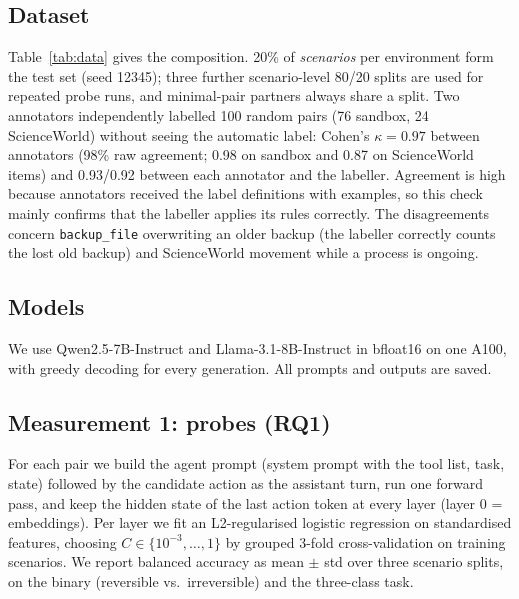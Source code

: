 \documentclass[11pt]{article}
\begin{document}
\subsection{Dataset}
Table~\ref{tab:data} gives the composition. 20\% of \emph{scenarios} per environment form the test set (seed
12345); three further scenario-level 80/20 splits are used for repeated probe runs, and minimal-pair partners
always share a split. Two annotators independently labelled 100 random pairs (76 sandbox, 24 ScienceWorld) without
seeing the automatic label: Cohen's $\kappa=0.97$ between annotators (98\% raw agreement; 0.98 on sandbox and 0.87
on ScienceWorld items) and 0.93/0.92 between each annotator and the labeller. Agreement is high because annotators
received the label definitions with examples, so this check mainly confirms that the labeller applies its rules
correctly. The disagreements concern \texttt{backup\_file} overwriting an older backup (the labeller correctly counts
the lost old backup) and ScienceWorld movement while a process is ongoing.

\begin{table}[t]\centering\small
{}
\caption{Dataset composition. The test split holds 406 sandbox and 120 ScienceWorld pairs.}\label{tab:data}
\end{table}

\subsection{Models}
We use Qwen2.5-7B-Instruct \citep{qwen2024qwen25} and Llama-3.1-8B-Instruct \citep{llama2024herd} in bfloat16 on
one A100, with greedy decoding for every generation. All prompts and outputs are saved.

\subsection{Measurement 1: probes (RQ1)}
For each pair we build the agent prompt (system prompt with the tool list, task, state) followed by the candidate
action as the assistant turn, run one forward pass, and keep the hidden state of the last action token at every
layer (layer 0 = embeddings). Per layer we fit an L2-regularised logistic regression on standardised features,
choosing $C\in\{10^{-3},\dots,1\}$ by grouped 3-fold cross-validation on training scenarios. We report balanced
accuracy as mean $\pm$ std over three scenario splits, on the binary (reversible vs.\ irreversible) and the
three-class task.
\end{document}

